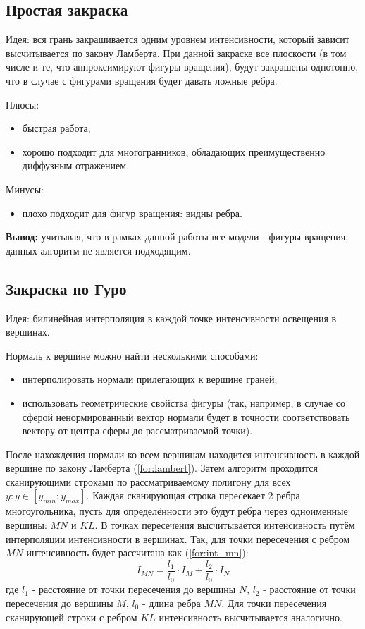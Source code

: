 \subsection{Простая закраска}

Идея: вся грань закрашивается одним уровнем интенсивности, который зависит высчитывается по закону Ламберта. При данной закраске все плоскости (в том числе и те, что аппроксимируют фигуры вращения), будут закрашены однотонно, что в случае с фигурами вращения будет давать ложные ребра.

Плюсы:
\begin{itemize}
    \item быстрая работа;
    \item хорошо подходит для многогранников, обладающих преимущественно диффузным отражением.
\end{itemize}

Минусы:

\begin{itemize}
    \item плохо подходит для фигур вращения: видны ребра.
\end{itemize}

\textbf{Вывод:} учитывая, что в рамках данной работы все модели - фигуры вращения, данных алгоритм не является подходящим.

\subsection{Закраска по Гуро}
Идея: билинейная интерполяция в каждой точке интенсивности освещения в вершинах.

Нормаль к вершине можно найти несколькими способами:
\begin{itemize}
    \item интерполировать нормали прилегающих к вершине граней;
    \item использовать геометрические свойства фигуры (так, например, в случае со сферой ненормированный вектор нормали будет в точности соответствовать вектору от центра сферы до рассматриваемой точки).
\end{itemize}

После нахождения нормали ко всем вершинам находится интенсивность в каждой вершине по закону Ламберта (\ref{for:lambert}).
Затем алгоритм проходится сканирующими строками по рассматриваемому полигону для всех $y: y \in [y_{min}; y_{max}]$. Каждая сканирующая строка пересекает 2 ребра многоугольника, пусть для определённости это будут ребра через одноименные вершины: $MN$ и $KL$. В точках пересечения высчитывается интенсивность путём интерполяции интенсивности в вершинах. Так, для точки пересечения с ребром $MN$ интенсивность будет рассчитана как (\ref{for:int_mn}):
\begin{equation}
    \label{for:int_mn}
    I_{MN} = \frac{l_1}{l_0} \cdot I_M + \frac{l_2}{l_0} \cdot I_N
\end{equation}
где $l_1$ - расстояние от точки пересечения до вершины $N$, $l_2$ - расстояние от точки пересечения до вершины $M$, $l_0$ - длина ребра $MN$.
Для точки пересечения сканирующей строки с ребром $KL$ интенсивность высчитывается аналогично.

